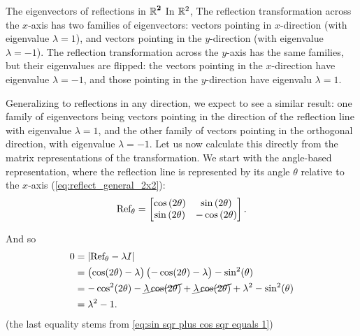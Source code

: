 \begin{example}{The eigenvectors of reflections in $\bm{\Rs[2]}$}{}
	In $\Rs[2]$, The reflection transformation across the $x$-axis has two families of eigenvectors: vectors pointing in $x$-direction (with eigenvalue $\lambda=1$), and vectors pointing in the $y$-direction (with eigenvalue $\lambda=-1$). The reflection transformation across the $y$-axis has the same families, but their eigenvalues are flipped: the vectors pointing in the $x$-direction have eigenvalue $\lambda=-1$, and those pointing in the $y$-direction have eigenvalu $\lambda=1$.

	\vspace{1em}
	Generalizing to reflections in any direction, we expect to see a similar result: one family of eigenvectors being vectors pointing in the direction of the reflection line with eigenvalue $\lambda=1$, and the other family of vectors pointing in the orthogonal direction, with eigenvalue $\lambda=-1$. Let us now calculate this directly from the matrix representations of the transformation. We start with the angle-based representation, where the reflection line is represented by its angle $\theta$ relative to the $x$-axis (\autoref{eq:reflect_general_2x2}):
	\[
		\Refl_{\theta} = \begin{bmatrix} \cos \left( 2\theta \right) & \sin \left( 2\theta \right) \\ \sin \left( 2\theta \right) & -\cos \left( 2\theta \right) \end{bmatrix}.
	\]

	And so
	\begin{align*}
		0 &= \left|\Refl_{\theta}-\lambda I\right|\\
		  &= \left(\cos(2\theta)-\lambda\right)\left( -\cos(2\theta)-\lambda \right) - \sin^{2}(\theta)\\
		  &= -\cos^{2}(2\theta)-\cancel{\lambda\cos(2\theta)}+\cancel{\lambda\cos(2\theta)}+\lambda^{2} - \sin^{2}(\theta)\\
		  &= \lambda^{2}-1.
	\end{align*}
	(the last equality stems from \autoref{eq:sin sqr plus cos sqr equals 1})


\end{example}
